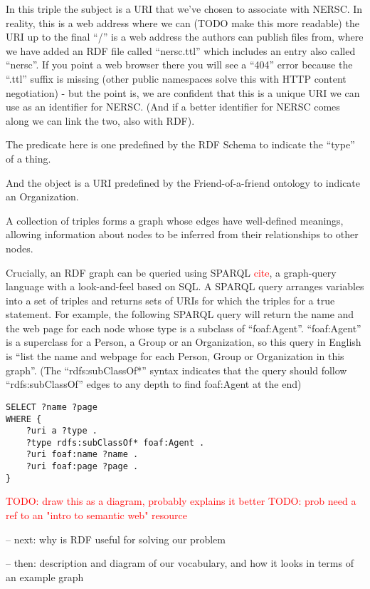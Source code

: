 In this triple the subject is a URI that we've chosen to associate with 
NERSC. In reality, this is a web address where we can 
(TODO make this more readable)
the URI up to the final ``/'' is a web address the authors
can publish files from, where we have added an RDF file called ``nersc.ttl'' 
which includes an entry also called ``nersc''. If you point a web browser 
there you will see a ``404'' error because the ``.ttl'' suffix is missing 
(other public namespaces solve this with HTTP content negotiation) - but the 
point is, we are confident that this is a unique URI we can use as an 
identifier for NERSC. (And if a better identifier for NERSC comes along 
we can link the two, also with RDF).

The predicate here is one predefined by the RDF Schema to indicate the ``type''
of a thing.

And the object is a URI predefined by the Friend-of-a-friend ontology to
indicate an Organization.

A collection of triples forms a graph whose edges have well-defined meanings, 
allowing information about nodes to be inferred from their relationships to 
other nodes.

Crucially, an RDF graph can be queried using SPARQL \textcolor{red}{cite}, a
graph-query language with a look-and-feel based on SQL. A SPARQL query 
arranges variables into a set of triples and returns sets of URIs for which
the triples for a true statement. For example, the following SPARQL query
will return the name and the web page for each node whose type is 
a subclass of ``foaf:Agent''. ``foaf:Agent'' is a superclass for a Person, a 
Group or an Organization, so this query in English is ``list the name and 
webpage for each Person, Group or Organization in this graph''. (The 
``rdfs:subClassOf*'' syntax indicates that the query should follow 
``rdfs:subClassOf'' edges to any depth to find foaf:Agent at the end)

\begin{verbatim}
SELECT ?name ?page 
WHERE {
    ?uri a ?type .
    ?type rdfs:subClassOf* foaf:Agent .
    ?uri foaf:name ?name .
    ?uri foaf:page ?page .
}
\end{verbatim}

\textcolor{red}{TODO: draw this as a diagram, probably explains it better}
\textcolor{red}{TODO: prob need a ref to an "intro to semantic web" resource}

-- next: why is RDF useful for solving our problem


-- then: description and diagram of our vocabulary, and how it looks in terms of an example graph


